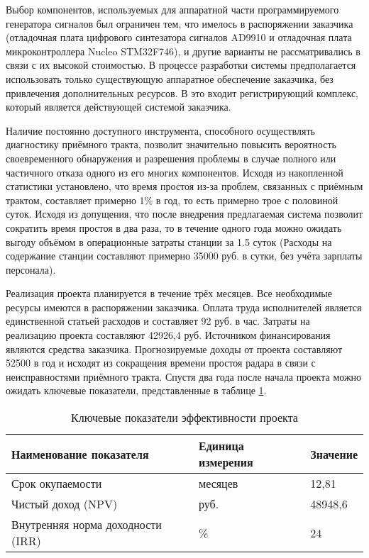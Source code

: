 \documentclass{report}
\begin{document}
Выбор компонентов, используемых для аппаратной части программируемого генератора сигналов был ограничен тем, что имелось в распоряжении заказчика (отладочная плата цифрового синтезатора сигналов AD9910 и отладочная плата микроконтроллера Nucleo STM32F746), и другие варианты не рассматривались в связи с их высокой стоимостью. В процессе разработки системы предполагается использовать только существующую аппаратное обеспечение заказчика, без привлечения дополнительных ресурсов. В это входит регистрирующий комплекс, который является действующей системой заказчика.

Наличие постоянно доступного инструмента, способного осуществлять диагностику приёмного тракта, позволит значительно повысить вероятность своевременного обнаружения и разрешения проблемы в случае полного или частичного отказа одного из его многих компонентов. Исходя из накопленной статистики установлено, что время простоя из-за проблем, связанных с приёмным трактом, составляет примерно 1\% в год, то есть примерно трое с половиной суток. Исходя из допущения, что после внедрения предлагаемая система позволит сократить время простоя в два раза, то в течение одного года можно ожидать выгоду объёмом в операционные затраты станции за 1.5 суток (Расходы на содержание станции составляют примерно 35000 руб. в сутки, без учёта зарплаты персонала).

Реализация проекта планируется в течение трёх месяцев. Все необходимые ресурсы имеются в распоряжении заказчика. Оплата труда исполнителей является единственной статьей расходов и составляет 92 руб. в час. Затраты на реализацию проекта составляют 42926,4 руб. Источником финансирования являются средства заказчика. Прогнозируемые доходы от проекта составляют 52500 в год и исходят из сокращения времени простоя радара в связи с неисправностями приёмного тракта. Спустя два года после начала проекта можно ожидать ключевые показатели, представленные в таблице \ref{table:econ1}.

\begin{table}[H]
    \centering   %
    \caption{Ключевые показатели эффективности проекта}    %
    \begin{tabular}{|m{5cm}|m{5cm}|m{5cm}|}        %
    \hline   %
    \centering\arraybackslash Наименование показателя &  \centering\arraybackslash Единица измерения & \centering\arraybackslash Значение \\ \hline
    Срок окупаемости & месяцев & 12,81 \\ \hline
    Чистый доход (NPV) & руб. & 48948,6 \\ \hline
    Внутренняя норма доходности (IRR) & \% & 24 \\ \hline
    \end{tabular}
    \label{table:econ1}
\end{table}
\end{document}
